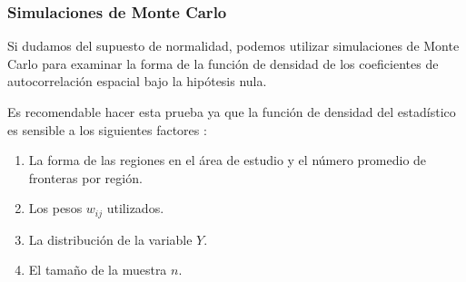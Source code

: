   \subsubsection{Simulaciones de Monte Carlo}\label{sec:montecarlo}
    Si dudamos del supuesto de normalidad, podemos utilizar simulaciones de Monte Carlo para examinar la forma de la función de densidad de los coeficientes de autocorrelación espacial bajo la hipótesis nula. 

    Es recomendable hacer esta prueba ya que la función de densidad del estadístico es sensible a los siguientes factores  \citep{clifford1981}:
    \begin{enumerate}
    \item La forma de las regiones en el área de estudio y el número promedio de fronteras por región.
    \item Los pesos $w_{ij}$ utilizados.
    \item La distribución de la variable $Y$.
    \item El tamaño de la muestra $n$.
    \end{enumerate} 

